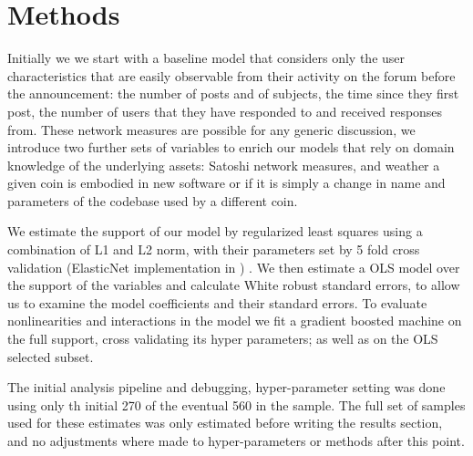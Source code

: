 
\section{Methods }

Initially we we start with a baseline model that considers only the user characteristics that are easily observable from their activity on the forum before the announcement: the number of posts and of subjects,  the time since they first post, the number of users that they have responded to and received responses from. 
These network measures are possible for any generic discussion, we introduce two further sets of variables to enrich our models that rely on domain knowledge of the underlying assets: Satoshi network measures, and weather a given coin is embodied in new software or if it is simply a change in name and parameters of the codebase used by a different coin.

We estimate the support of our model by regularized least squares using a combination of L1 and L2 norm, with their parameters set by 5 fold cross validation  (ElasticNet implementation in \cite{scikit-learn}) . 
We then estimate a OLS model over the support of the variables and calculate White robust standard errors, to allow us to examine the model coefficients and their standard errors. 
To evaluate nonlinearities and interactions  in the model we fit a gradient boosted machine on the full support, cross validating its hyper parameters; as well as on the OLS selected subset. 

The initial analysis pipeline and debugging, hyper-parameter setting was done using only th initial 270 of the eventual 560 in the sample.
The full set of samples used for these estimates was only estimated before writing the results section, and no adjustments where made to hyper-parameters or methods after this point.
